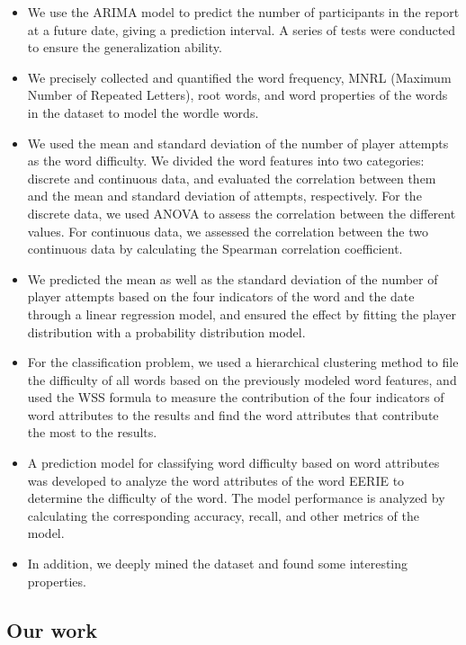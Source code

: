 \documentclass[12pt]{article}  %
\begin{document}
\begin{itemize}
	\setlength{\parsep}{0ex} %
	\setlength{\topsep}{2ex} %
	\setlength{\itemsep}{1ex} %
	\item We use the ARIMA model to predict the number of participants in the report at a future date, giving a prediction interval. A series of tests were conducted to ensure the generalization ability.
	\item We precisely collected and quantified the word frequency, MNRL (Maximum Number of Repeated Letters), root words, and word properties of the words in the dataset to model the wordle words.  
	\item We used the mean and standard deviation of the number of player attempts as the word difficulty. We divided the word features into two categories: discrete and continuous data, and evaluated the correlation between them and the mean and standard deviation of attempts, respectively. For the discrete data, we used ANOVA to assess the correlation between the different values. For continuous data, we assessed the correlation between the two continuous data by calculating the Spearman correlation coefficient.  
	\item We predicted the mean as well as the standard deviation of the number of player attempts based on the four indicators of the word and the date through a linear regression model, and ensured the effect by fitting the player distribution with a probability distribution model.
	\item For the classification problem, we used a hierarchical clustering method to file the difficulty of all words based on the previously modeled word features, and used the WSS formula to measure the contribution of the four indicators of word attributes to the results and find the word attributes that contribute the most to the results.
	\item A prediction model for classifying word difficulty based on word attributes was developed to analyze the word attributes of the word EERIE to determine the difficulty of the word. The model performance is analyzed by calculating the corresponding accuracy, recall, and other metrics of the model.  
	\item In addition, we deeply mined the dataset and found some interesting properties.
\end{itemize}

\subsection{Our work}
\end{document}
